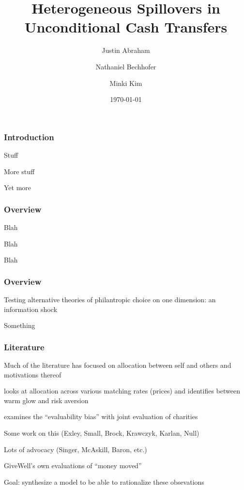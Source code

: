 \documentclass[aspectratio=169]{beamer}
\title{Heterogeneous Spillovers in Unconditional Cash Transfers}
\author[Abraham, Bechhofer, Kim]{Justin Abraham \and Nathaniel Bechhofer \and Minki Kim}
\institute{University of California, San Diego}
\date{\today}
\newenvironment{wideitemize}{\itemize\addtolength{\itemsep}{10pt}}{\enditemize}
\newenvironment{wideenumerate}{\enumerate\addtolength{\itemsep}{10pt}}{\endenumerate}
\begin{document}
\begin{frame}
	\titlepage
\end{frame}

\begin{frame}[fragile] \frametitle{Introduction}

    \begin{wideenumerate}
        \item Stuff
        \item More stuff
        \item Yet more
    \end{wideenumerate}

\end{frame}

\begin{frame}[fragile] \frametitle{Overview}

    \begin{wideitemize}
        \item Blah
        \item Blah
        \item Blah
    \end{wideitemize}

\end{frame}

\begin{frame}[fragile] \frametitle{Overview}

    Testing alternative theories of philantropic choice on one dimension: an information shock

    \begin{wideitemize}
        \item Something
    \end{wideitemize}

\end{frame}

\begin{frame}[fragile] \frametitle{Literature}

    \begin{wideitemize}
        \item Much of the literature has focused on allocation between self and others and motivations thereof
        \item \textcite{null_warm_2011} looks at allocation across various matching rates (prices) and identifies between warm glow and risk aversion
        \item \textcite{caviola_evaluability_2014} examines the ``evaluability bias'' with joint evaluation of charities
        \item Some work on this (Exley, Small, Brock, Krawczyk, Karlan, Null)
        \item Lots of advocacy (Singer, McAskill, Baron, etc.)
        \item GiveWell's own evaluations of ``money moved''
        \item Goal: synthesize a model to be able to rationalize these obsevations
    \end{wideitemize}

\end{frame}
\end{document}
